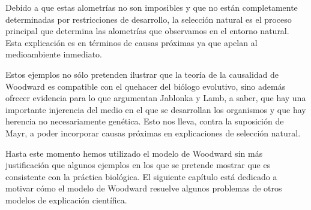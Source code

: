 Debido a que estas alometrías no son imposibles y que no están completamente determinadas por restricciones de desarrollo, la selección natural es el proceso principal que determina las alometrías que observamos en el entorno natural. Esta explicación es en términos de causas próximas ya que apelan al medioambiente inmediato.

Estos ejemplos no sólo pretenden ilustrar que la teoría de la causalidad de Woodward es compatible con el quehacer del biólogo evolutivo, sino además ofrecer evidencia para lo que argumentan Jablonka y Lamb, a saber, que hay una importante injerencia del medio en el que se desarrollan los organismos y que hay herencia no necesariamente genética.  Esto nos lleva, contra la suposición de Mayr, a poder incorporar causas próximas en explicaciones de selección natural.

Hasta este momento hemos utilizado el modelo de Woodward sin más justificación que algunos ejemplos en los que se pretende mostrar que es consistente con la práctica biológica. El siguiente capítulo está dedicado a motivar cómo el modelo de Woodward resuelve algunos problemas de otros modelos de explicación científica.
